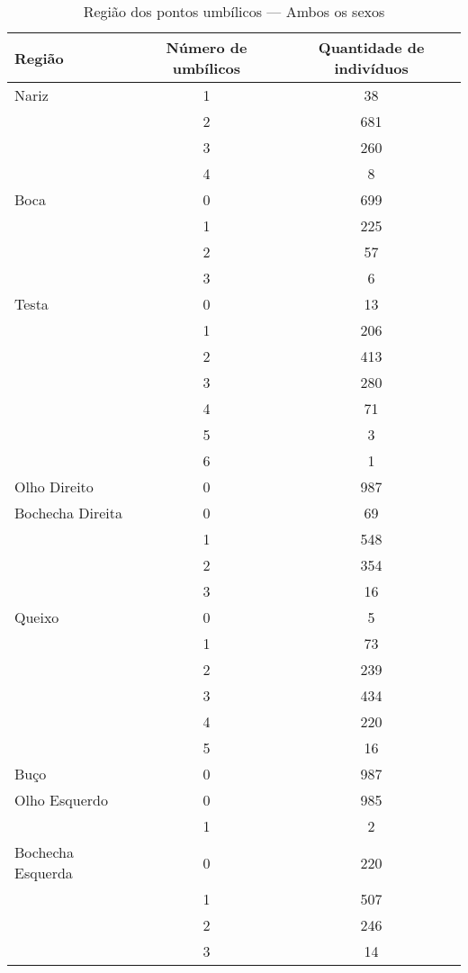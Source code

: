 \documentclass[a4paper,12pt]{article}
\begin{document}
\begin{table}[h!]
\centering
\caption{Região dos pontos umbílicos — Ambos os sexos}
\begin{tabular}{l c c}
\hline
\textbf{Região} & \textbf{Número de umbílicos} & \textbf{Quantidade de indivíduos} \\
\hline
Nariz & 1 & 38 \\
      & 2 & 681 \\
      & 3 & 260 \\
      & 4 & 8 \\
\hline
Boca  & 0 & 699 \\
      & 1 & 225 \\
      & 2 & 57 \\
      & 3 & 6 \\
\hline
Testa & 0 & 13 \\
      & 1 & 206 \\
      & 2 & 413 \\
      & 3 & 280 \\
      & 4 & 71 \\
      & 5 & 3 \\
      & 6 & 1 \\
\hline
Olho Direito & 0 & 987 \\
\hline
Bochecha Direita & 0 & 69 \\
                 & 1 & 548 \\
                 & 2 & 354 \\
                 & 3 & 16 \\
\hline
Queixo & 0 & 5 \\
       & 1 & 73 \\
       & 2 & 239 \\
       & 3 & 434 \\
       & 4 & 220 \\
       & 5 & 16 \\
\hline
Buço & 0 & 987 \\
\hline
Olho Esquerdo & 0 & 985 \\
              & 1 & 2 \\
\hline
Bochecha Esquerda & 0 & 220 \\
                  & 1 & 507 \\
                  & 2 & 246 \\
                  & 3 & 14 \\
\hline
\end{tabular}
\end{table}
\end{document}
